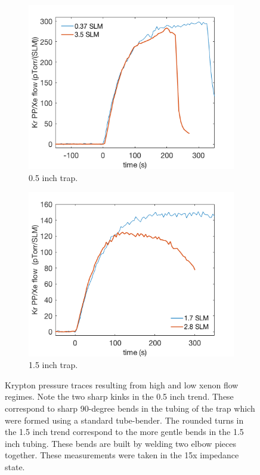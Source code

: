 \begin{figure}[h!]
\centering
\begin{subfigure}{0.5\textwidth}
  \centering
  \includegraphics[width=\textwidth]{Figures/SLAC_flow_turnover.png}
  \caption{0.5 inch trap.}
  \label{fig:KrDrop0p5}
\end{subfigure}%
\begin{subfigure}{0.5\textwidth}
  \centering
  \includegraphics[width=\textwidth]{Figures/SLAC_flow_turnover_1p5in.png}
  \caption{1.5 inch trap.}
  \label{fig:KrDrop1p5}
\end{subfigure}
\caption{Krypton pressure traces resulting from high and low xenon flow regimes. Note the two sharp kinks in the 0.5 inch trend. These correspond to sharp 90-degree bends in the tubing of the trap which were formed using a standard tube-bender. The rounded turns in the 1.5 inch trend correspond to the more gentle bends in the 1.5 inch tubing. These bends are built by welding two elbow pieces together. These measurements were taken in the 15x impedance state.} 
\label{fig:KrDrop}
\end{figure}

